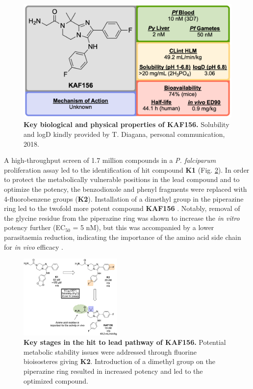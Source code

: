 \documentclass[twocolumn]{bmcart}%
\begin{document}
\begin{figure}[h]
	\includegraphics [scale=0.575] {Figure26}
	\caption{{\bf Key biological and physical properties of KAF156.} Solubility and logD kindly provided by T. Diagana, personal communication, 2018.}
	\label{Figure26}
\end{figure}

A high-throughput screen of 1.7 million compounds in a \textit{P. falciparum} proliferation assay led to the identification of hit compound \textbf{K1} (Fig. \ref{Figure27}). In order to protect the metabolically vulnerable positions in the lead compound and to optimize the potency, the benzodioxole and phenyl fragments were replaced with 4-fluorobenzene groups (\textbf{K2}). Installation of a dimethyl group in the piperazine ring led to the twofold more potent compound \textbf{KAF156} \cite{Nagle2012,Wu2011}. Notably, removal of the glycine residue from the piperazine ring was shown to increase the \textit{in vitro} potency further (EC$_{50}$ = 5 nM), but this was accompanied by a lower parasitaemia reduction, indicating the importance of the amino acid side chain for \textit{in vivo} efficacy \cite{Nagle2012}.

\begin{figure}[h]
	\includegraphics [width=0.45\textwidth] {Figure27}
	\caption{{\bf Key stages in the hit to lead pathway of KAF156.} Potential metabolic stability issues were addressed through fluorine bioisosteres giving \textbf{K2}. Introduction of a dimethyl group on the piperazine ring resulted in increased potency and led to the optimized compound.}
	\label{Figure27}
\end{figure}
\end{document}
